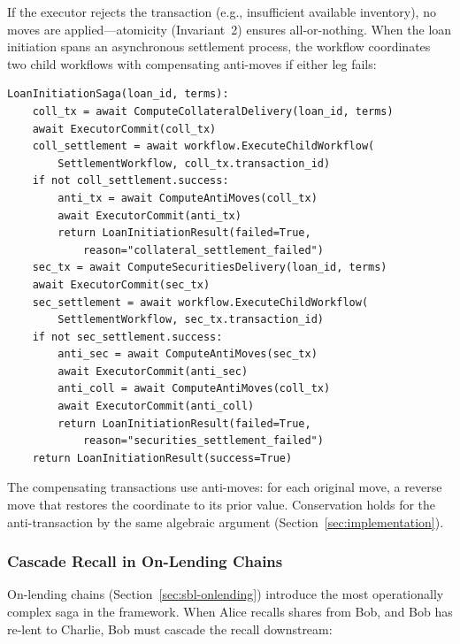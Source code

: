 \documentclass[11pt,a4paper]{article}
\begin{document}
\noindent If the executor rejects the transaction (e.g., insufficient available inventory), no moves are applied---atomicity (Invariant~2) ensures all-or-nothing. When the loan initiation spans an asynchronous settlement process, the workflow coordinates two child workflows with compensating anti-moves if either leg fails:

\begin{lstlisting}
LoanInitiationSaga(loan_id, terms):
    coll_tx = await ComputeCollateralDelivery(loan_id, terms)
    await ExecutorCommit(coll_tx)
    coll_settlement = await workflow.ExecuteChildWorkflow(
        SettlementWorkflow, coll_tx.transaction_id)
    if not coll_settlement.success:
        anti_tx = await ComputeAntiMoves(coll_tx)
        await ExecutorCommit(anti_tx)
        return LoanInitiationResult(failed=True,
            reason="collateral_settlement_failed")
    sec_tx = await ComputeSecuritiesDelivery(loan_id, terms)
    await ExecutorCommit(sec_tx)
    sec_settlement = await workflow.ExecuteChildWorkflow(
        SettlementWorkflow, sec_tx.transaction_id)
    if not sec_settlement.success:
        anti_sec = await ComputeAntiMoves(sec_tx)
        await ExecutorCommit(anti_sec)
        anti_coll = await ComputeAntiMoves(coll_tx)
        await ExecutorCommit(anti_coll)
        return LoanInitiationResult(failed=True,
            reason="securities_settlement_failed")
    return LoanInitiationResult(success=True)
\end{lstlisting}

\noindent The compensating transactions use anti-moves: for each original move, a reverse move that restores the coordinate to its prior value. Conservation holds for the anti-transaction by the same algebraic argument (Section~\ref{sec:implementation}).

\subsubsection{Cascade Recall in On-Lending Chains}

On-lending chains (Section~\ref{sec:sbl-onlending}) introduce the most operationally complex saga in the framework. When Alice recalls shares from Bob, and Bob has re-lent to Charlie, Bob must cascade the recall downstream:
\end{document}
